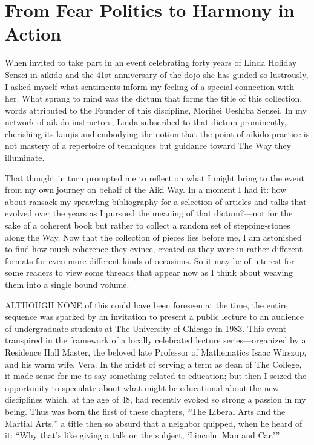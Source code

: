 \chapter{From Fear Politics to Harmony in Action}

When invited to take part in an event celebrating forty years of Linda Holiday Sensei in aikido and the 41st anniversary of the dojo she has guided so lustrously, I asked myself what sentiments inform my feeling of a special connection with her. What sprang to mind was the dictum that forms the title of this collection, words attributed to the Founder of this discipline, Morihei Ueshiba Sensei. In my network of aikido instructors, Linda subscribed to that dictum prominently, cherishing its kanjis and embodying the notion that the point of aikido practice is not mastery of a repertoire of techniques but guidance toward The Way they illuminate.

That thought in turn prompted me to reflect on what I might bring to the event from my own journey on behalf of the Aiki Way. In a moment I had it: how about ransack my sprawling bibliography for a selection of articles and talks that evolved over the years as I pursued the meaning of that dictum?---not for the sake of a coherent book but rather to collect a random set of stepping-stones along the Way. Now that the collection of pieces lies before me, I am astonished to find how much coherence they evince, created as they were in rather different formats for even more different kinds of occasions. So it may be of interest for some readers to view some threads that appear now as I think about weaving them into a single bound volume.

\vspace{1.5em}

{\uppercase{Although none}} of this could have been foreseen at the time, the entire sequence was sparked by an invitation to present a public lecture to an audience of undergraduate students at The University of Chicago in 1983. This event transpired in the framework of a locally celebrated lecture series---organized by a Residence Hall Master, the beloved late Professor of Mathematics Isaac Wirszup, and his warm wife, Vera. In the midst of serving a term as dean of The College, it made sense for me to say something related to education; but then I seized the opportunity to speculate about what might be educational about the new disciplines which, at the age of 48, had recently evoked so strong a passion in my being.  Thus was born the first of these chapters, ``The Liberal Arts and the Martial Arts,'' a title then so absurd that a neighbor quipped, when he heard of it: ``Why that's like giving a talk on the subject, `Lincoln: Man and Car.'''

